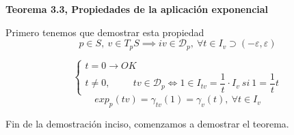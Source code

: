 \documentclass[openany]{book}
\begin{document}
\begin{center}
\textbf{Teorema 3.3, Propiedades de la aplicación exponencial}
\end{center}

Primero tenemos que demostrar esta propiedad
$$ p \in S, \ v \in T_pS \implies  iv \in \mathcal{D} _p, \ \forall t \in I_v \supset (- \varepsilon , \varepsilon ) $$
\begin{demonstration}
  $$ \left\{ \begin{array}{l}
    t=0 \to OK\\
    t \ne 0, \hspace{1cm} tv \in \mathcal{D}_p \iff 1 \in I_{tv} = \dfrac{1}{t} \cdot I_v\ si\ 1=\dfrac{1}{t}t
  \end{array} \right. $$
  $$ exp_p(tv) = \gamma _{tv}(1) = \gamma _v (t) , \ \forall t \in I_v $$
\end{demonstration}
Fin de la demostración inciso, comenzamos a demostrar el teorema.
\end{document}

